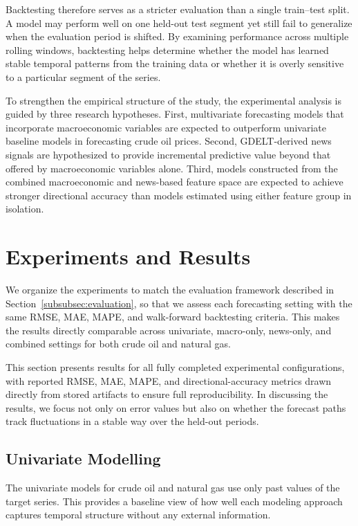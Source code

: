 \documentclass[pdflatex,sn-mathphys-num]{sn-jnl}%
\theoremstyle{thmstyleone}%
\theoremstyle{thmstyletwo}%
\theoremstyle{thmstylethree}%
\begin{document}
Backtesting therefore serves as a stricter evaluation than a single train--test split. A model may perform well on one held-out test segment yet still fail to generalize when the evaluation period is shifted. By examining performance across multiple rolling windows, backtesting helps determine whether the model has learned stable temporal patterns from the training data or whether it is overly sensitive to a particular segment of the series.

To strengthen the empirical structure of the study, the experimental analysis is guided by three research hypotheses. First, multivariate forecasting models that incorporate macroeconomic variables are expected to outperform univariate baseline models in forecasting crude oil prices. Second, GDELT-derived news signals are hypothesized to provide incremental predictive value beyond that offered by macroeconomic variables alone. Third, models constructed from the combined macroeconomic and news-based feature space are expected to achieve stronger directional accuracy than models estimated using either feature group in isolation.

\section{Experiments and Results}\label{sec5}

We organize the experiments to match the evaluation framework described in Section~\ref{subsubsec:evaluation}, so that we assess each forecasting setting with the same RMSE, MAE, MAPE, and walk-forward backtesting criteria. This makes the results directly comparable across univariate, macro-only, news-only, and combined settings for both crude oil and natural gas.

This section presents results for all fully completed experimental configurations, with reported RMSE, MAE, MAPE, and directional-accuracy metrics drawn directly from stored artifacts to ensure full reproducibility. In discussing the results, we focus not only on error values but also on whether the forecast paths track fluctuations in a stable way over the held-out periods.

\subsection{Univariate Modelling}\label{subsec:univariate_models}

The univariate models for crude oil and natural gas use only past values of the target series. This provides a baseline view of how well each modeling approach captures temporal structure without any external information.
\end{document}
